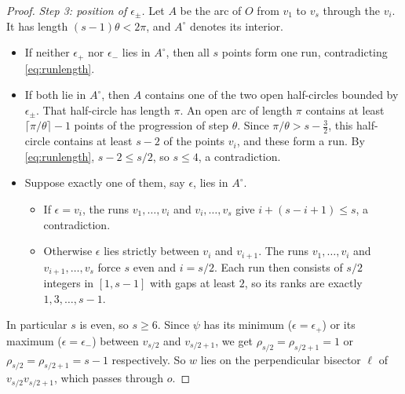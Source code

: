 \begin{proof}
\emph{Step 3: position of $\epsilon_\pm$.} Let $A$ be the arc of $O$ from $v_1$ to $v_s$ through the $v_i$. It has length $(s-1)\theta<2\pi$, and $A^\circ$ denotes its interior.
\begin{itemize}[leftmargin=2em]
\item If neither $\epsilon_+$ nor $\epsilon_-$ lies in $A^\circ$, then all $s$ points form one run, contradicting \eqref{eq:runlength}.
\item If both lie in $A^\circ$, then $A$ contains one of the two open half-circles bounded by $\epsilon_\pm$. That half-circle has length $\pi$. An open arc of length $\pi$ contains at least $\lceil\pi/\theta\rceil-1$ points of the progression of step $\theta$. Since $\pi/\theta>s-\tfrac32$, this half-circle contains at least $s-2$ of the points $v_i$, and these form a run. By \eqref{eq:runlength}, $s-2\le s/2$, so $s\le4$, a contradiction.
\item Suppose exactly one of them, say $\epsilon$, lies in $A^\circ$.
 \begin{itemize}[leftmargin=1.5em]
 \item If $\epsilon=v_i$, the runs $v_1,\dots,v_i$ and $v_i,\dots,v_s$ give $i+(s-i+1)\le s$, a contradiction.
 \item Otherwise $\epsilon$ lies strictly between $v_i$ and $v_{i+1}$. The runs $v_1,\dots,v_i$ and $v_{i+1},\dots,v_s$ force $s$ even and $i=s/2$. Each run then consists of $s/2$ integers in $[1,s-1]$ with gaps at least $2$, so its ranks are exactly $1,3,\dots,s-1$.
 \end{itemize}
\end{itemize}
In particular $s$ is even, so $s\ge6$. Since $\psi$ has its minimum ($\epsilon=\epsilon_+$) or its maximum ($\epsilon=\epsilon_-$) between $v_{s/2}$ and $v_{s/2+1}$, we get $\rho_{s/2}=\rho_{s/2+1}=1$ or $\rho_{s/2}=\rho_{s/2+1}=s-1$ respectively. So $w$ lies on the perpendicular bisector $\ell$ of $v_{s/2}v_{s/2+1}$, which passes through $o$.


\end{proof}
